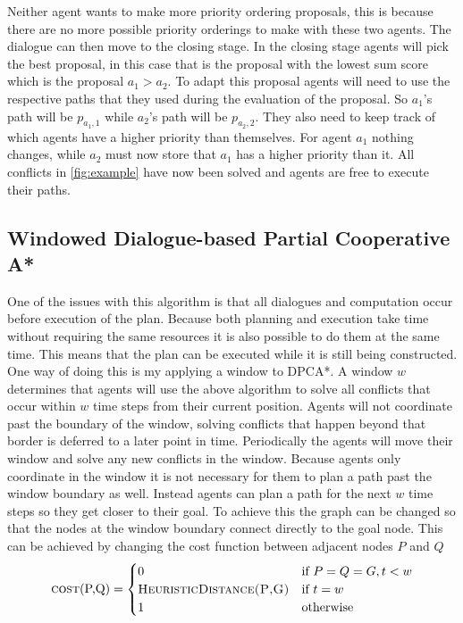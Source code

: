 Neither agent wants to make more priority ordering proposals, this is because
there are no more possible priority orderings to make with these two agents.
The dialogue can then move to the closing stage. In the closing stage agents
will pick the best proposal, in this case that is the proposal with the lowest
sum score which is the proposal $a_1 > a_2$. To adapt this proposal agents will
need to use the respective paths that they used during the evaluation of the
proposal. So $a_1$'s path will be $p_{a_1,1}$ while $a_2$'s path will be
$p_{a_2,2}$. They also need to keep track of which agents have a higher
priority than themselves. For agent $a_1$ nothing changes, while $a_2$ must now
store that $a_1$ has a higher priority than it. All conflicts in
\autoref{fig:example} have now been solved and agents are free to execute their
paths.

\subsection{Windowed Dialogue-based Partial Cooperative A*}
One of the issues with this algorithm is that all dialogues and computation
occur before execution of the plan. Because both planning and execution take
time without requiring the same resources it is also possible to do them at the
same time. This means that the plan can be executed while it is still being
constructed. One way of doing this is my applying a window to DPCA*. A
window $w$ determines that agents will use the above algorithm to solve all
conflicts that occur within $w$ time steps from their current position. Agents
will not coordinate past the boundary of the window, solving conflicts that
happen beyond that border is deferred to a later point in time. Periodically
the agents will move their window and solve any new conflicts in the window.
Because agents only coordinate in the window it is not necessary for them to
plan a path past the window boundary as well. Instead agents can plan a path
for the next $w$ time steps so they get closer to their goal. To achieve this
the graph can be changed so that the nodes at the window boundary connect
directly to the goal node. This can be achieved by changing the cost function
between adjacent nodes $P$ and $Q$ \cite{silver2005}
\[
\text{\textsc{cost}(P,Q)} =
\begin{cases}
    0 & \text{if } P = Q = G, t < w \\
    \textsc{HeuristicDistance(P,G)} & \text{if } t = w \\
    1 & \text{otherwise}
\end{cases}
\]

